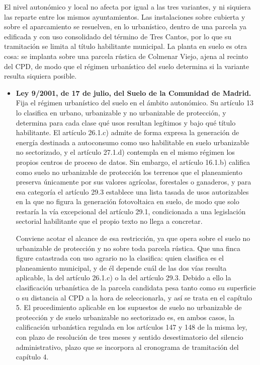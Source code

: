 El nivel autonómico y local no afecta por igual a las tres variantes, y ni siquiera las reparte entre los mismos ayuntamientos. Las instalaciones sobre cubierta y sobre el aparcamiento se resuelven, en lo urbanístico, dentro de una parcela ya edificada y con uso consolidado del término de Tres Cantos, por lo que su tramitación se limita al título habilitante municipal. La planta en suelo es otra cosa: se implanta sobre una parcela rústica de Colmenar Viejo, ajena al recinto del \ac{CPD}, de modo que el régimen urbanístico del suelo determina si la variante resulta siquiera posible.

\begin{itemize}
    \item \textbf{Ley 9/2001, de 17 de julio, del Suelo de la Comunidad de Madrid.} Fija el régimen urbanístico del suelo en el ámbito autonómico. Su artículo 13 lo clasifica en urbano, urbanizable y no urbanizable de protección, y determina para cada clase qué usos resultan legítimos y bajo qué título habilitante. El artículo 26.1.c) admite de forma expresa la generación de energía destinada a autoconsumo como uso habilitable en suelo urbanizable no sectorizado, y el artículo 27.1.d) contempla en el mismo régimen los propios centros de proceso de datos. Sin embargo, el artículo 16.1.b) califica como suelo no urbanizable de protección los terrenos que el planeamiento preserva únicamente por sus valores agrícolas, forestales o ganaderos, y para esa categoría el artículo 29.3 establece una lista tasada de usos autorizables en la que no figura la generación fotovoltaica en suelo, de modo que solo restaría la vía excepcional del artículo 29.1, condicionada a una legislación sectorial habilitante que el propio texto no llega a concretar.

    Conviene acotar el alcance de esa restricción, ya que opera sobre el suelo no urbanizable de protección y no sobre toda parcela rústica. Que una finca figure catastrada con uso agrario no la clasifica: quien clasifica es el planeamiento municipal, y de él depende cuál de las dos vías resulta aplicable, la del artículo 26.1.c) o la del artículo 29.3. Debido a ello la clasificación urbanística de la parcela candidata pesa tanto como su superficie o su distancia al \ac{CPD} a la hora de seleccionarla, y así se trata en el capítulo 5. El procedimiento aplicable en los supuestos de suelo no urbanizable de protección y de suelo urbanizable no sectorizado es, en ambos casos, la calificación urbanística regulada en los artículos 147 y 148 de la misma ley, con plazo de resolución de tres meses y sentido desestimatorio del silencio administrativo, plazo que se incorpora al cronograma de tramitación del capítulo 4.
\end{itemize}

